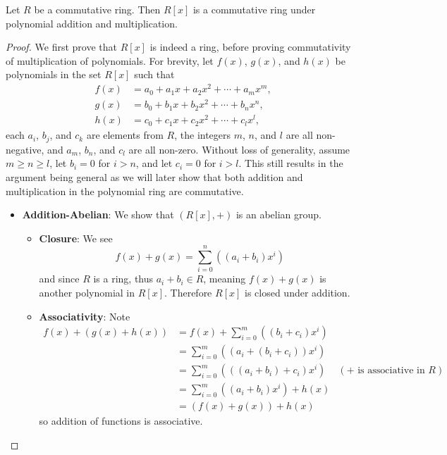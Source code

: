 \begin{proposition}
    Let $R$ be a commutative ring. Then $R[x]$ is a commutative ring under polynomial addition and multiplication.
\end{proposition}
\begin{proof}
    We first prove that $R[x]$ is indeed a ring, before proving commutativity of multiplication of polynomials. For brevity, let $f(x)$, $g(x)$, and $h(x)$ be polynomials in the set $R[x]$ such that
    \begin{align*}
        f(x) &= a_0 + a_1x + a_2x^2 + \cdots + a_mx^m,\\
        g(x) &= b_0 + b_1x + b_2x^2 + \cdots + b_nx^n,\\
        h(x) &= c_0 + c_1x + c_2x^2 + \cdots + c_lx^l,
    \end{align*}
    each $a_i$, $b_j$, and $c_k$ are elements from $R$, the integers $m$, $n$, and $l$ are all non-negative, and $a_m$, $b_n$, and $c_l$ are all non-zero. Without loss of generality, assume $m \geq n \geq l$, let $b_i = 0$ for $i > n$, and let $c_i = 0$ for $i > l$. This still results in the argument being general as we will later show that both addition and multiplication in the polynomial ring are commutative.
    \begin{itemize}
        \item \textbf{Addition-Abelian}: We show that $(R[x], +)$ is an abelian group.
        \begin{itemize}
            \item \textbf{Closure}: We see
            \[
                f(x) + g(x) = \sum_{i=0}^n\left((a_i+b_i)x^i\right)
            \]
            and since $R$ is a ring, thus $a_i+b_i \in R$, meaning $f(x) + g(x)$ is another polynomial in $R[x]$. Therefore $R[x]$ is closed under addition.
            
            \item \textbf{Associativity}: Note
            \begin{align*}
                f(x) + (g(x) + h(x)) &= f(x) + \sum_{i=0}^m\left((b_i+c_i)x^i\right)\\
                &= \sum_{i=0}^m\left((a_i + (b_i + c_i))x^i\right)\\
                &= \sum_{i=0}^m\left(((a_i + b_i) + c_i)x^i\right) & (+ \text{ is associative in }R)\\
                &= \sum_{i=0}^m\left((a_i+b_i)x^i\right) + h(x)\\
                &= (f(x) + g(x)) + h(x)
            \end{align*}
            so addition of functions is associative.
            

\end{itemize}
\end{itemize}
\end{proof}
